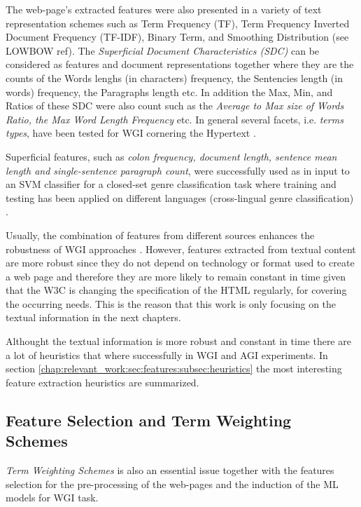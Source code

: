 The web-page's extracted features were also presented in a variety of  text  representation schemes such as Term Frequency (TF), Term Frequency  Inverted Document Frequency (TF-IDF), Binary Term, and Smoothing Distribution (see LOWBOW ref). The \textit{Superficial Document Characteristics (SDC)} can be considered as features and document representations together where they are the counts of the Words lenghs (in characters) frequency, the Sentencies length (in words) frequency, the Paragraphs length etc. In addition the Max, Min, and Ratios of these SDC were also count such as the \textit{Average to Max size of Words Ratio, the Max Word Length Frequency} etc. In general several facets, i.e. \textit{terms types}, have been tested for WGI cornering the Hypertext \parencite{feldman2009classifying,santini2005linguistic}.

 Superficial features, such as \textit{colon frequency, document length, sentence mean length and single-sentence paragraph count}, were successfully used as in input to an SVM classifier for a closed-set genre classification task where training and testing has been applied on different languages (cross-lingual genre classification) \parencite{nguyen2019cross}.

Usually, the combination of features from different sources enhances the robustness of WGI approaches \parencite{levering2008using,kanaris2009learning}. However, features extracted from textual content are more robust since they do not  depend on technology or format used to create a web page and therefore they are more likely to remain constant in time given that the W3C is changing the specification of the HTML regularly, for covering the occurring needs. This is the reason that this work is only focusing on the textual information in the next chapters.

Althought the textual information is more robust and constant in time there are a lot of heuristics that where successfully in WGI and AGI experiments. In section \ref{chap:relevant_work:sec:features:subsec:heuristics} the most interesting feature extraction heuristics are summarized.


\subsection{Feature Selection and Term Weighting Schemes}
 
 \textit{Term Weighting Schemes} is also an essential issue together with the features selection for the pre-processing of the web-pages and the induction of the ML models for WGI task.

